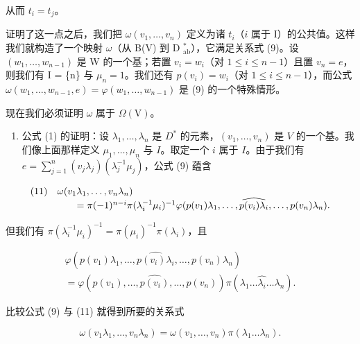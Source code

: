 从而 \(t_i = t_j\)。

证明了这一点之后，我们把 \(\omega(v_1, \ldots, v_n)\) 定义为诸 \(t_i\)（\(i\) 属于 I）的公共值。这样我们就构造了一个映射 \(\omega\)（从 B(V) 到 D \(_{\text{ab}}^*\)），它满足关系式 (9)。设 \((w_1, \ldots, w_{n-1})\) 是 W 的一个基；若置 \(v_i = w_i\)（对 \(1 \leqslant i \leqslant n-1\)）且置 \(v_n = e\)，则我们有 I = \{n\} 与 \(\mu_n = 1\)。我们还有 \(p(v_i) = w_i\)（对 \(1 \leqslant i \leqslant n-1\)），而公式 \(\omega(w_1, \ldots, w_{n-1}, e) = \varphi(w_1, \ldots, w_{n-1})\) 是 (9) 的一个特殊情形。

现在我们必须证明 \(\omega\) 属于 \(\Omega (\mathrm{V})\)。

\begin{enumerate}
\def\labelenumi{\Alph{enumi})}
\setcounter{enumi}{2}
\tightlist
\item
  公式 (1) 的证明：设 \(\lambda_1, \ldots, \lambda_n\) 是 \(D^*\) 的元素，\((v_1, \ldots, v_n)\) 是 \(V\) 的一个基。我们像上面那样定义 \(\mu_1, \ldots, \mu_n\) 与 \(I\)。取定一个 \(i\) 属于 \(I\)。由于我们有 \(e = \sum_{j=1}^{n} (v_j \lambda_j)(\lambda_j^{-1} \mu_j)\)，公式 (9) 蕴含
\end{enumerate}

\[
\begin{array}{l l} (1 1) & \omega (v _ {1} \lambda_ {1}, \ldots , v _ {n} \lambda_ {n}) \\ & \qquad = \pi (- 1) ^ {n - i} \pi (\lambda_ {i} ^ {- 1} \mu_ {i}) ^ {- 1} \varphi (p (v _ {1}) \lambda_ {1}, \ldots , \widehat {p (v _ {i}) \lambda_ {i}}, \ldots , p (v _ {n}) \lambda_ {n}). \end{array}
\]

但我们有 \(\pi (\lambda_i^{-1}\mu_i)^{-1} = \pi (\mu_i)^{-1}\pi (\lambda_i)\)，且

\[
\begin{array}{c} \varphi (p (v _ {1}) \lambda_ {1}, \ldots , \widehat {p (v _ {i}) \lambda_ {i}}, \ldots , p (v _ {n}) \lambda_ {n}) \\ = \varphi (p (v _ {1}), \ldots , \widehat {p (v _ {i})}, \ldots , p (v _ {n})) \pi (\lambda_ {1} \ldots \widehat {\lambda_ {i}} \ldots \lambda_ {n}). \end{array}
\]

比较公式 (9) 与 (11) 就得到所要的关系式

\[
\omega (v _ {1} \lambda_ {1}, \ldots , v _ {n} \lambda_ {n}) = \omega (v _ {1}, \ldots , v _ {n}) \pi (\lambda_ {1} \ldots \lambda_ {n}).
\]

